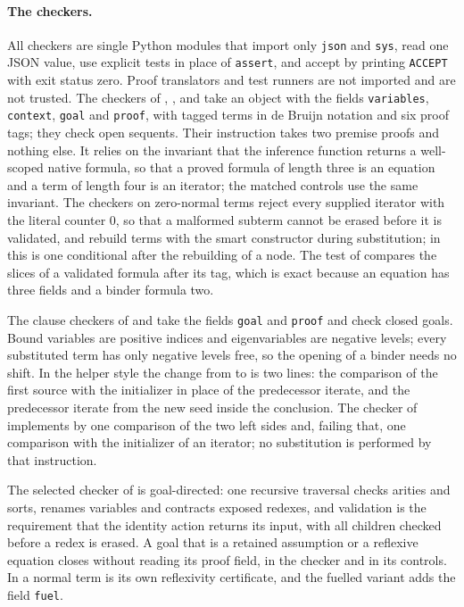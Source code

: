 \paragraph{The checkers.}
All checkers are single Python modules that import only \texttt{json} and
\texttt{sys}, read one JSON value, use explicit tests in place of
\texttt{assert}, and accept by printing \texttt{ACCEPT} with exit status
zero. Proof translators and test runners are not imported and are not
trusted. The checkers of ,
,  and
 take an object with the fields \texttt{variables},
\texttt{context}, \texttt{goal} and \texttt{proof}, with tagged terms in
de Bruijn notation and six proof tags; they check open sequents. Their
 instruction takes two premise proofs and nothing else. It
relies on the invariant that the inference function returns a well-scoped
native formula, so that a proved formula of length three is an equation
and a term of length four is an iterator; the matched controls use the same
invariant. The checkers on zero-normal terms reject every supplied iterator
with the literal counter $0$, so that a malformed subterm cannot be erased
before it is validated, and rebuild terms with the smart constructor during
substitution; in  this is one conditional after the
rebuilding of a node. The test of  compares the slices
of a validated formula after its tag, which is exact because an equation
has three fields and a binder formula two.

The clause checkers of  and  take
the fields \texttt{goal} and \texttt{proof} and check closed goals. Bound
variables are positive indices and eigenvariables are negative levels;
every substituted term has only negative levels free, so the opening of a
binder needs no shift. In the helper style the change from 
to  is two lines: the comparison of the first source
with the initializer in place of the predecessor iterate, and the
predecessor iterate from the new seed inside the conclusion. The checker of
 implements  by one comparison of
the two left sides and, failing that, one comparison with the initializer of
an iterator; no substitution is performed by that instruction.

The selected checker of  is goal-directed: one
recursive traversal checks arities and sorts, renames variables and
contracts exposed redexes, and validation is the requirement that the
identity action returns its input, with all children checked before a
redex is erased. A goal that is a retained assumption or a reflexive
equation closes without reading its proof field, in the checker and in its
controls. In  a normal term is its own
reflexivity certificate, and the fuelled variant adds the field
\texttt{fuel}.

